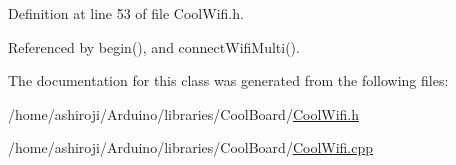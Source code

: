 Definition at line 53 of file Cool\+Wifi.\+h.



Referenced by begin(), and connect\+Wifi\+Multi().



The documentation for this class was generated from the following files\+:\begin{DoxyCompactItemize}
\item 
/home/ashiroji/\+Arduino/libraries/\+Cool\+Board/\hyperlink{CoolWifi_8h}{Cool\+Wifi.\+h}\item 
/home/ashiroji/\+Arduino/libraries/\+Cool\+Board/\hyperlink{CoolWifi_8cpp}{Cool\+Wifi.\+cpp}\end{DoxyCompactItemize}
